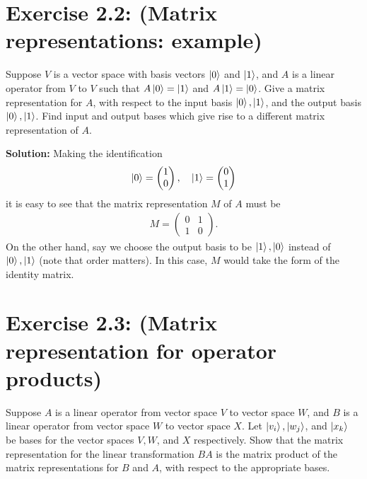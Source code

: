 \documentclass{book}
\begin{document}
\section*{Exercise 2.2: (Matrix representations: example)}
    Suppose $V$ is a vector space with basis vectors $\ket{0}$ and $\ket{1}$, and $A$ is a linear operator from $V$ to $V$ such that $A\ket{0}=\ket{1}$ and $A\ket{1}=\ket{0}$. Give a matrix representation for $A$, with respect to the input basis $\ket{0}, \ket{1}$, and the output basis $\ket{0}, \ket{1}$. Find input and output bases which give rise to a different matrix representation of $A$.
    
    \textbf{Solution:} Making the identification
    \begin{align}
    \ket{0} =
    \begin{pmatrix}
        1 \\
        0
    \end{pmatrix}, \quad
    \ket{1} =
    \begin{pmatrix}
        0 \\
        1
    \end{pmatrix}
    \end{align}
    it is easy to see that the matrix representation $M$ of $A$ must be 
    \begin{align}
        M = 
        \begin{pmatrix}
            0 & 1 \\
            1 & 0
        \end{pmatrix}.
    \end{align}
    On the other hand, say we choose the output basis to be $\ket{1},\ket{0}$ instead of $\ket{0},\ket{1}$ (note that order matters). In this case, $M$ would take the form of the identity matrix.

\section*{Exercise 2.3: (Matrix representation for operator products)}
    Suppose $A$ is a linear operator from vector space $V$ to vector space $W$, and $B$ is a linear operator from vector space $W$ to vector space $X$. Let $\ket{v_i}, \ket{w_j}$, and $\ket{x_k}$ be bases for the vector spaces $V, W$, and $X$ respectively. Show that the matrix representation for the linear transformation $BA$ is the matrix product of the matrix representations for $B$ and $A$, with respect to the appropriate bases.
    
\end{document}
